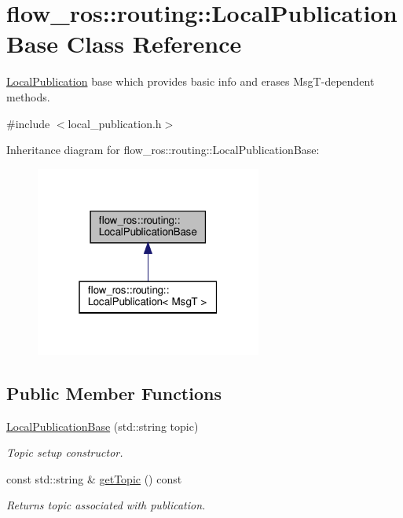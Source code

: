 \hypertarget{classflow__ros_1_1routing_1_1_local_publication_base}{}\section{flow\+\_\+ros\+:\+:routing\+:\+:Local\+Publication\+Base Class Reference}
\label{classflow__ros_1_1routing_1_1_local_publication_base}


\hyperlink{classflow__ros_1_1routing_1_1_local_publication}{Local\+Publication} base which provides basic info and erases Msg\+T-\/dependent methods.  




{\ttfamily \#include $<$local\+\_\+publication.\+h$>$}



Inheritance diagram for flow\+\_\+ros\+:\+:routing\+:\+:Local\+Publication\+Base\+:\nopagebreak
\begin{figure}[H]
\begin{center}
\leavevmode
\includegraphics[width=211pt]{classflow__ros_1_1routing_1_1_local_publication_base__inherit__graph}
\end{center}
\end{figure}
\subsection*{Public Member Functions}
\begin{DoxyCompactItemize}
\item 
\hyperlink{classflow__ros_1_1routing_1_1_local_publication_base_af9fda03de061e405e283029280db322f}{Local\+Publication\+Base} (std\+::string topic)
\begin{DoxyCompactList}\small\item\em Topic setup constructor. \end{DoxyCompactList}\item 
const std\+::string \& \hyperlink{classflow__ros_1_1routing_1_1_local_publication_base_a3c5ed7bb057a44e05c7248cf908326ba}{get\+Topic} () const
\begin{DoxyCompactList}\small\item\em Returns topic associated with publication. \end{DoxyCompactList}\end{DoxyCompactItemize}


